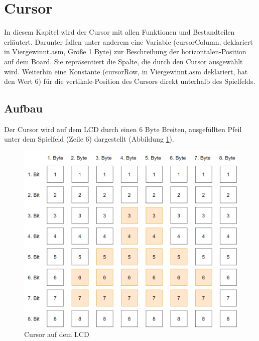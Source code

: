 \newpage
\section{Cursor}
    In diesem Kapitel wird der Cursor mit allen Funktionen und Bestandteilen erläutert.
    Darunter fallen unter anderem eine Variable (cursorColumn, deklariert in Viergewinnt.asm, Größe 1 Byte)
    zur Beschreibung der horizontalen-Position auf dem Board. Sie repräsentiert die Spalte, die durch den Cursor ausgewählt wird.
    Weiterhin eine Konstante (cursorRow, in Viergewinnt.asm deklariert, hat den Wert 6) für die vertikale-Position des Cursors direkt unterhalb des Spielfelds.

    \subsection{Aufbau}
        Der Cursor wird auf dem LCD durch einen 6 Byte Breiten, ausgefüllten Pfeil unter dem Spielfeld (Zeile 6) dargestellt (Abbildung \ref{fig:cursor}).

        \begin{figure}[H]
            \centering
            \includegraphics[scale=0.35]{img/cursor.png}    
            \caption{Cursor auf dem LCD}
            \label{fig:cursor}
        \end{figure}
    
